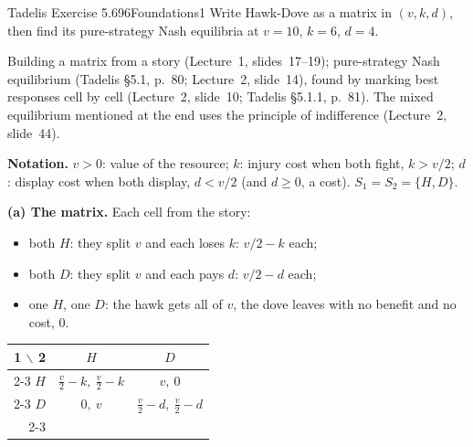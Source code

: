 \begin{exsol}{Tadelis Exercise 5.6}{96}{Foundations}{1}
\asked Write Hawk-Dove as a matrix in $(v,k,d)$, then find its pure-strategy Nash equilibria at
$v = 10$, $k = 6$, $d = 4$.

\method Building a matrix from a story (Lecture~1, slides~17--19); pure-strategy Nash equilibrium
(Tadelis \S5.1, p.~80; Lecture~2, slide~14), found by marking best responses cell by cell
(Lecture~2, slide~10; Tadelis \S5.1.1, p.~81). The mixed equilibrium mentioned at the end uses the
principle of indifference (Lecture~2, slide~44).

\solution
\textbf{Notation.} $v > 0$: value of the resource; $k$: injury cost when both fight, $k > v/2$;
$d$: display cost when both display, $d < v/2$ (and $d \ge 0$, a cost). $S_1 = S_2 = \{H, D\}$.

\textbf{(a) The matrix.} Each cell from the story:
\begin{itemize}
  \item both $H$: they split $v$ and each loses $k$: $v/2 - k$ each;
  \item both $D$: they split $v$ and each pays $d$: $v/2 - d$ each;
  \item one $H$, one $D$: the hawk gets all of $v$, the dove leaves with no benefit and no cost,
  $0$.
\end{itemize}
\begin{center}
\begin{tabular}{r|c|c|}
\multicolumn{1}{r}{1 $\backslash$ 2} & \multicolumn{1}{c}{$H$} & \multicolumn{1}{c}{$D$}\\ \cline{2-3}
$H$ & $\frac v2 - k,\ \frac v2 - k$ & $v,\ 0$ \\ \cline{2-3}
$D$ & $0,\ v$ & $\frac v2 - d,\ \frac v2 - d$ \\ \cline{2-3}
\end{tabular}
\end{center}


\end{exsol}
